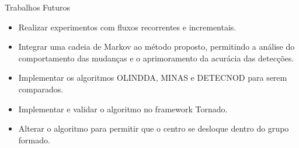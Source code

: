\documentclass[10pt]{beamer}
\newcommand{\themename}{\textbf{\textsc{metropolis}}\xspace}
\begin{document}
\begin{frame}{Trabalhos Futuros}
    \begin{itemize}
        \item<1 -> Realizar experimentos com fluxos recorrentes e incrementais.
        \item<1 -> Integrar uma cadeia de Markov ao método proposto, permitindo a análise do comportamento das mudanças e o aprimoramento da acurácia das detecções.
        \item<1 -> Implementar os algoritmos OLINDDA, MINAS e DETECNOD para serem comparados.
        \item<1 -> Implementar e validar o algoritmo no framework Tornado.
        \item<1 -> Alterar o algoritmo para permitir que o centro se desloque dentro do grupo formado.
      \end{itemize}
\end{frame}








\end{document}
